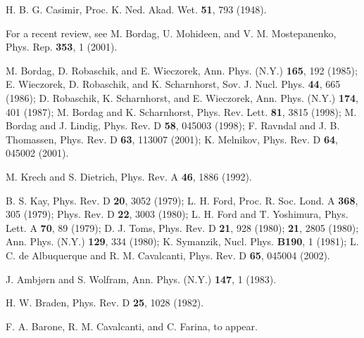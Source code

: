 \documentclass[a4paper,dvips,12pt]{article}
\begin{document}
\begin{thebibliography}{99}

 H. B. G. Casimir, 
Proc. K. Ned. Akad. Wet. {\bf 51}, 793 (1948).

 For a recent review, see
M. Bordag, U. Mohideen, and V. M. Mostepanenko,
Phys. Rep. {\bf 353}, 1 (2001).

 M. Bordag, D. Robaschik, and E. Wieczorek,
Ann. Phys. (N.Y.) {\bf 165}, 192 (1985); 
E. Wieczorek, D. Robaschik, and K. Scharnhorst, 
Sov. J. Nucl. Phys. {\bf 44}, 665 (1986); 
D. Robaschik, K. Scharnhorst, and E. Wieczorek, 
Ann. Phys. (N.Y.) {\bf 174}, 401 (1987); 
M. Bordag and K. Scharnhorst,  
Phys. Rev. Lett. {\bf 81}, 3815 (1998); 
M. Bordag and J. Lindig, 
Phys. Rev. D {\bf 58}, 045003 (1998); 
F. Ravndal and J. B. Thomassen,  
Phys. Rev. D {\bf 63}, 113007 (2001); 
K. Melnikov, 
Phys. Rev. D {\bf 64}, 045002 (2001).

 M. Krech and S. Dietrich, 
Phys. Rev. A {\bf 46}, 1886 (1992).

B. S. Kay, Phys. Rev. D {\bf 20}, 3052 (1979);
L. H. Ford, Proc. R. Soc. Lond. A {\bf 368}, 305 (1979);
Phys. Rev. D {\bf 22}, 3003 (1980);
L. H. Ford and T. Yoshimura,
Phys. Lett. A {\bf 70}, 89 (1979);
D. J. Toms, Phys. Rev. D {\bf 21}, 928 (1980);
{\bf 21}, 2805 (1980);
Ann. Phys. (N.Y.) {\bf 129}, 334 (1980);
K. Symanzik, Nucl. Phys. {\bf B190}, 1 (1981);
L. C. de Albuquerque and R. M. Cavalcanti,
Phys. Rev. D {\bf 65}, 045004 (2002).

 J. Ambj{\o}rn and S. Wolfram, 
Ann. Phys. (N.Y.) {\bf 147}, 1 (1983).

 H. W. Braden, Phys. Rev. D {\bf 25}, 1028 (1982). 

 F. A. Barone, R. M. Cavalcanti, and C. Farina, to appear.

\end{thebibliography}
%
\end{document}
